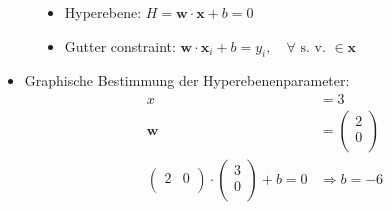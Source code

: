 \begin{frame}
\begin{figure}[h]
\begin{minipage}{0.4\textwidth}
{\begin{figure}[h]
{                    }
                \end{figure}
            }
        \end{minipage}
        \hfill
        \begin{minipage}{0.4\textwidth}
            \begin{itemize}
                \item<1-> Hyperebene: $ H = \boldsymbol{w} \cdot \boldsymbol{x} + b = 0 $
                \item<1-> Gutter constraint: $ \boldsymbol{w} \cdot \boldsymbol{x}_i + b = y_i, \quad \forall \text{ s. v. } \in \boldsymbol{x} $
            \end{itemize} 
        \end{minipage}
    \end{figure}

    \begin{itemize}
        \item <2-> Graphische Bestimmung der Hyperebenenparameter:
            \begin{align*}
                x &= 3 \\
                \boldsymbol{w} &= \left( \begin{matrix}
                    2 \\
                    0 \\
                \end{matrix} \right) \\
                \left( \begin{matrix}
                    2 & 0 \\
                \end{matrix} \right) \cdot \left( \begin{matrix}
                    3 \\
                    0 \\
                \end{matrix} \right) + b = 0 &\Rightarrow b = -6 \\
            \end{align*}
    \end{itemize}
\end{frame}

